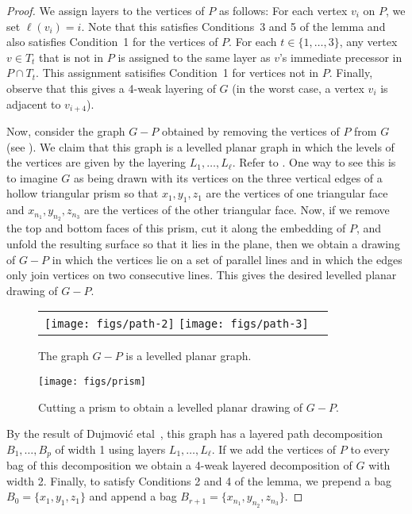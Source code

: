\documentclass{patmorin}
\begin{document}
\begin{proof}
  We assign layers to the vertices of $P$ as follows: For each
  vertex $v_i$ on $P$, we set $\ell(v_i)=i$.  Note that this satisfies
  Conditions~3 and 5 of the lemma and also satisfies Condition~1 for the
  vertices of $P$.  For each $t\in\{1,\ldots,3\}$, any vertex $v\in T_t$
  that is not in $P$ is assigned to the same layer as $v$'s immediate
  precessor in $P\cap T_t$.  This assignment satisifies Condition~1 for
  vertices not in $P$.  Finally, observe that this gives a 4-weak layering
  of $G$ (in the worst case, a vertex $v_i$ is adjacent to $v_{i+4}$).

  Now, consider the graph $G-P$ obtained by removing the vertices of
  $P$ from $G$ (see ).  We claim that this graph is a 
  levelled planar
  graph \cite{jxx} in which the levels of the vertices are given by the
  layering $L_1,\ldots,L_\ell$.  Refer to .  
  One way to see this is to imagine $G$
  as being drawn with its vertices on the three vertical edges of a
  hollow triangular prism so that $x_1,y_1,z_1$ are the vertices of
  one triangular face and $x_{n_1},y_{n_2},z_{n_3}$ are the vertices
  of the other triangular face.  Now, if we remove the top and bottom
  faces of this prism, cut it along the embedding of $P$, and unfold
  the resulting surface so that it lies in the plane, then we obtain a
  drawing of $G-P$ in which the vertices lie on a set of parallel lines
  and in which the edges only join vertices on two consecutive lines.
  This gives the desired levelled planar drawing of $G-P$.

  \begin{figure}
  \begin{center}
  \begin{tabular}{cc}
  \texttt{[image: figs/path-2]}
  \texttt{[image: figs/path-3]}
  \end{tabular}
  \end{center}
  \caption{The graph $G-P$ is a levelled planar graph.}
  \end{figure}


  \begin{figure}
     \begin{center}
        \texttt{[image: figs/prism]}
     \end{center}
     \caption{Cutting a prism to obtain a levelled planar drawing of $G-P$.}
  \end{figure}



  By the result of Dujmovi\'c etal\ \cite[Proof of Theorem~5]{jxx},
  this graph has a layered path decomposition $B_1,\ldots,B_p$ of
  width 1 using layers $L_1,\ldots,L_\ell$.  If we add the vertices
  of $P$ to every bag of this decomposition we obtain a 4-weak layered
  decomposition of $G$ with width 2.  Finally, to satisfy Conditions
  2 and 4 of the lemma, we prepend a bag $B_0=\{x_1,y_1,z_1\}$ and append a bag
  $B_{r+1}=\{x_{n_1},y_{n_2},z_{n_3}\}$.
\end{proof}
\end{document}
